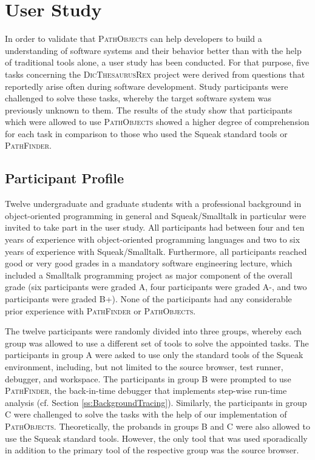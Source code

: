 \clearpage
\section{User Study}
\label{s:DiscussionEvaluation}
In order to validate that \textsc{PathObjects} can help developers to build a understanding of software systems and their behavior better than with the help of traditional tools alone, a user study has been conducted.
For that purpose, five tasks concerning the \textsc{DicThesaurusRex} project were derived from questions that reportedly arise often during software development.
Study participants were challenged to solve these tasks, whereby the target software system was previously unknown to them.
The results of the study show that participants which were allowed to use \textsc{PathObjects} showed a higher degree of comprehension for each task in comparison to those who used the Squeak standard tools or \textsc{PathFinder}.

\subsection{Participant Profile}
Twelve undergraduate and graduate students with a professional background in object-oriented programming in general and Squeak/Smalltalk in particular were invited to take part in the user study.
All participants had between four and ten years of experience with object-oriented programming languages and two to six years of experience with Squeak/Smalltalk.
Furthermore, all participants reached good or very good grades in a mandatory software engineering lecture, which included a Smalltalk programming project as major component of the overall grade (six participants were graded A, four participants were graded A-, and two participants were graded B+).
None of the participants had any considerable prior experience with \textsc{PathFinder} or \textsc{PathObjects}.

The twelve participants were randomly divided into three groups, whereby each group was allowed to use a different set of tools to solve the appointed tasks.
The participants in group A were asked to use only the standard tools of the Squeak environment, including, but not limited to the source browser, test runner, debugger, and workspace.
The participants in group B were prompted to use \textsc{PathFinder}, the back-in-time debugger that implements step-wise run-time analysis (cf. Section \ref{ss:BackgroundTracing}).
Similarly, the participants in group C were challenged to solve the tasks with the help of our implementation of \textsc{PathObjects}.
Theoretically, the probands in groups B and C were also allowed to use the Squeak standard tools.
However, the only tool that was used sporadically in addition to the primary tool of the respective group was the source browser.


